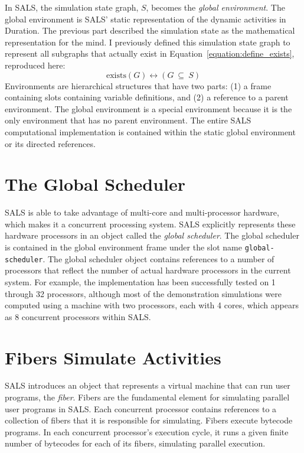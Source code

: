 In SALS, the simulation state graph, $S$, becomes the \emph{global
  environment}.  The global environment is SALS' static representation
of the dynamic activities in Duration.  The previous part described
the simulation state as the mathematical representation for the mind.
I previously defined this simulation state graph to represent all
subgraphs that actually exist in
Equation\ \ref{equation:define_exists}, reproduced here:
\begin{equation*}
\text{exists}(G) \longleftrightarrow (G ~{\subseteq}~ S)
\end{equation*}
Environments are hierarchical structures that have two parts: (1) a
frame containing slots containing variable definitions, and (2) a
reference to a parent environment.  The global environment is a
special environment because it is the only environment that has no
parent environment.  The entire SALS computational implementation is
contained within the static global environment or its directed
references.

\section{The Global Scheduler}

SALS is able to take advantage of multi-core and multi-processor
hardware, which makes it a concurrent processing system.  SALS
explicitly represents these hardware processors in an object called
the \emph{global scheduler}.  The global scheduler is contained in the
global environment frame under the slot name {\tt global-scheduler}.
The global scheduler object contains references to a number of
processors that reflect the number of actual hardware processors in
the current system.  For example, the implementation has been
successfully tested on 1 through 32 processors, although most of the
demonstration simulations were computed using a machine with two
processors, each with 4 cores, which appears as 8 concurrent
processors within SALS.

\section{Fibers Simulate Activities}

SALS introduces an object that represents a virtual machine that can
run user programs, the \emph{fiber}.  Fibers are the fundamental
element for simulating parallel user programs in SALS.  Each
concurrent processor contains references to a collection of fibers
that it is responsible for simulating.  Fibers execute bytecode
programs.  In each concurrent processor's execution cycle, it runs a
given finite number of bytecodes for each of its fibers, simulating
parallel execution.

